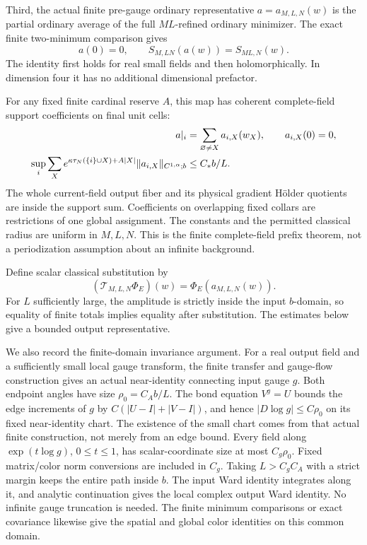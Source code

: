 \documentclass[11pt]{article}
\theoremstyle{remark}
\begin{document}
Third, the actual finite pre-gauge ordinary representative
\(a=a_{M,L,N}(w)\) is the partial ordinary average of the
full \(ML\)-refined ordinary minimizer. The exact finite
two-minimum comparison gives
\begin{equation}
 a(0)=0,\qquad
 S_{M,LN}(a(w))=S_{ML,N}(w).
 \label{fcc-reference-transport}
\end{equation}
The identity first holds for real small fields and then
holomorphically. In dimension four it has no additional
dimensional prefactor.

For any fixed finite cardinal reserve \(A\), this map has
coherent complete-field support coefficients on final unit
cells:
\begin{align}
 a|_i&=\sum_{\varnothing\ne X}a_{i,X}(w_X),
       \qquad a_{i,X}(0)=0,\notag\\
 \sup_i\sum_X e^{\kappa\tau_N(\{i\}\cup X)+A|X|}
       \|a_{i,X}\|_{C^{1,\alpha};b}
      &\le C_* b/L.
 \label{fcc-pregauge-family}
\end{align}
The whole current-field output fiber and its physical
gradient H\"older quotients are inside the support sum.
Coefficients on overlapping fixed collars are restrictions
of one global assignment. The constants and the permitted
classical radius are uniform in \(M,L,N\). This is the
finite complete-field prefix theorem, not a periodization
assumption about an infinite background.

Define scalar classical substitution by
\begin{equation}
 (\mathcal T_{M,L,N}\Phi_E)(w)=\Phi_E(a_{M,L,N}(w)).
 \label{fcc-transport}
\end{equation}
For \(L\) sufficiently large, the amplitude is strictly
inside the input \(b\)-domain, so equality of finite totals
implies equality after substitution. The estimates below
give a bounded output representative.

We also record the finite-domain invariance argument.
For a real output field and a sufficiently small local
gauge transform, the finite transfer and gauge-flow
construction gives an actual near-identity connecting
input gauge \(g\). Both endpoint angles have size
\(\rho_0=C_A b/L\). The bond equation \(V^g=U\) bounds
the edge increments of \(g\) by
\(C(|U-I|+|V-I|)\), and hence
\(|D\log g|\le C\rho_0\) on its fixed near-identity chart.
The existence of the small chart comes from that actual
finite construction, not merely from an edge bound.
Every field along \(\exp(t\log g)\), \(0\le t\le1\), has
scalar-coordinate size at most \(C_g\rho_0\). Fixed
matrix/color norm conversions are included in \(C_g\).
Taking \(L>C_gC_A\) with a strict margin keeps the entire
path inside \(b\). The input Ward identity integrates
along it, and analytic continuation gives the local
complex output Ward identity. No infinite gauge
truncation is needed. The finite minimum comparisons
or exact covariance likewise give the spatial and
global color identities on this common domain.
\end{document}
